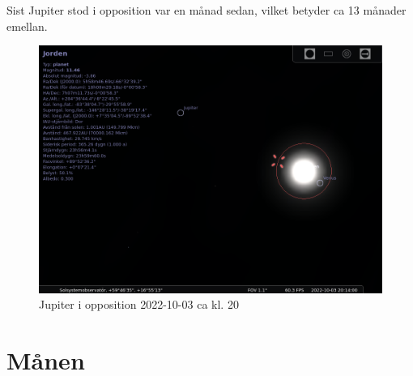 \documentclass[./exercises.tex]{subfiles}
\begin{document}
\begin{itemize}
Sist Jupiter stod i opposition var en månad sedan, vilket betyder ca 13 månader emellan.
\begin{figure}[H]
\centering
  \includegraphics[scale=0.4]{stellarium-053.png}
  \caption{Jupiter i opposition 2022-10-03 ca kl. 20 }
  \label{fig4}
\end{figure}
\end{itemize}


\section{Månen}
\end{document}
